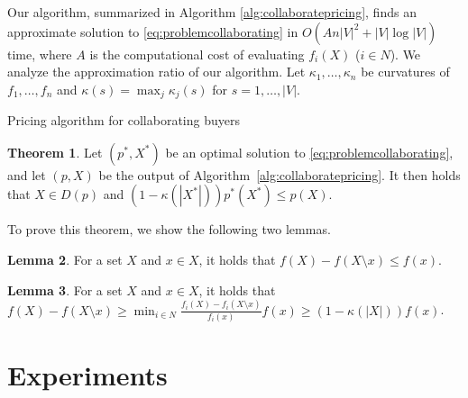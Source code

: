 \documentclass[letterpaper]{article}
\theoremstyle{definition}
\newtheorem{theorem}{Theorem}
\newtheorem{lemma}[theorem]{Lemma}
\begin{document}
Our algorithm, summarized in Algorithm \ref{alg:collaboratepricing},
finds an approximate solution to \eqref{eq:problemcollaborating}
in $O(A n |V|^2 + |V| \log |V|)$ time,
where $A$ is the computational cost of evaluating $f_i(X)$ ($i \in N$).
We analyze the approximation ratio of our algorithm.
Let $\kappa_1, \ldots, \kappa_n$ be curvatures of $f_1, \ldots, f_n$
and \(\kappa(s) = \max_j \kappa_j (s)\) for $s=1,\dots,|V|$.

\begin{algorithm}[tb]
\caption{Pricing algorithm for collaborating buyers}
\label{alg:collaboratepricing}
\begin{algorithmic}
\end{algorithmic}
\end{algorithm}

\begin{theorem}\label{thm:collaborating}
Let $(p^*, X^*)$ be an optimal solution to \eqref{eq:problemcollaborating}, 
and let $(p, X)$ be the output of Algorithm~\ref{alg:collaboratepricing}.
It then holds that \(X\in D(p)\) and 
\((1 - \kappa(|X^*|)) p^*(X^*) \le p(X)\).
\end{theorem}

To prove this theorem, we show the following two lemmas. 
\begin{lemma}\label{lem:collaborating 1}
For a set $X$ and $x\in X$, it holds that
$ f(X) - f(X \setminus x) \le f(x)$. %
\end{lemma}

\begin{lemma}\label{lem:collaborating 2}
For a set $X$ and $x\in X$, it holds that
$f(X) - f(X \setminus x) \ge \min_{i\in N}\frac{f_i(X)-f_i(X\setminus x)}{f_i(x)}f(x)
\ge (1 - \kappa(|X|)) f(x)$. 
\end{lemma}


\section{Experiments}
\label{sec:experiments}
\end{document}
